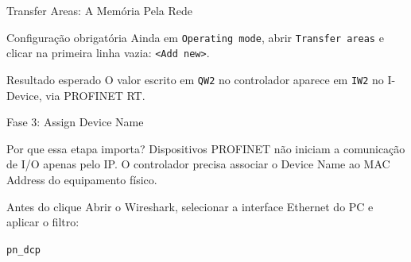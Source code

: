 \documentclass[10pt, aspectratio=169]{beamer}
\begin{document}
\begin{frame}{Transfer Areas: A Mem\'oria Pela Rede}
    \small
    \begin{block}{Configura\c{c}\~ao obrigat\'oria}
        Ainda em \texttt{Operating mode}, abrir \texttt{Transfer areas} e clicar na primeira linha vazia: \texttt{<Add new>}.
    \end{block}

    \vspace{0.2cm}
    \centering

    \vspace{0.35cm}
    \begin{block}{Resultado esperado}
        O valor escrito em \texttt{QW2} no controlador aparece em \texttt{IW2} no I-Device, via PROFINET RT.
    \end{block}
\end{frame}

\begin{frame}{Fase 3: Assign Device Name}
    \small
    \begin{block}{Por que essa etapa importa?}
        Dispositivos PROFINET n\~ao iniciam a comunica\c{c}\~ao de I/O apenas pelo IP. O controlador precisa associar o \alert{Device Name} ao MAC Address do equipamento f\'isico.
    \end{block}

    \begin{block}{Antes do clique}
        Abrir o Wireshark, selecionar a interface Ethernet do PC e aplicar o filtro:
        \begin{center}
            \Large\texttt{pn\_dcp}
        \end{center}
    \end{block}
\end{frame}
\end{document}
